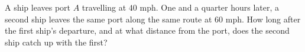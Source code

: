A ship leaves port $A$ travelling at $40$ mph. One and a quarter hours later, a second ship leaves the same port along the same route at $60$ mph. How long after the first ship's departure, and at what distance from the port, does the second ship catch up with the first?
